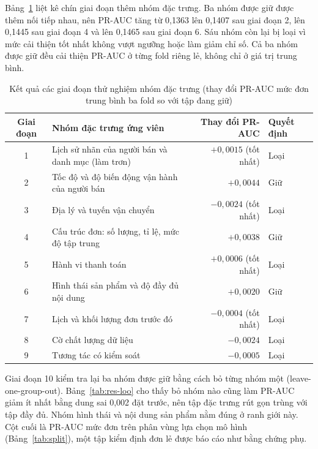 Bảng~\ref{tab:res-phases} liệt kê chín giai đoạn thêm nhóm đặc trưng. Ba nhóm được giữ được thêm nối tiếp nhau, nên PR-AUC tăng từ 0,1363 lên 0,1407 sau giai đoạn 2, lên 0,1445 sau giai đoạn 4 và lên 0,1465 sau giai đoạn 6. Sáu nhóm còn lại bị loại vì mức cải thiện tốt nhất không vượt ngưỡng hoặc làm giảm chỉ số. Cả ba nhóm được giữ đều cải thiện PR-AUC ở từng fold riêng lẻ, không chỉ ở giá trị trung bình.

\begin{table}[htbp]\centering\small
\caption{Kết quả các giai đoạn thử nghiệm nhóm đặc trưng (thay đổi PR-AUC mức đơn trung bình ba fold so với tập đang giữ)}\label{tab:res-phases}
\begin{tabular}{clrl}
\toprule
Giai đoạn & Nhóm đặc trưng ứng viên & Thay đổi PR-AUC & Quyết định \\
\midrule
1 & Lịch sử nhãn của người bán và danh mục (làm trơn) & $+0{,}0015$ (tốt nhất) & Loại \\
2 & Tốc độ và độ biến động vận hành của người bán & $+0{,}0044$ & Giữ \\
3 & Địa lý và tuyến vận chuyển & $-0{,}0024$ (tốt nhất) & Loại \\
4 & Cấu trúc đơn: số lượng, tỉ lệ, mức độ tập trung & $+0{,}0038$ & Giữ \\
5 & Hành vi thanh toán & $+0{,}0006$ (tốt nhất) & Loại \\
6 & Hình thái sản phẩm và độ đầy đủ nội dung & $+0{,}0020$ & Giữ \\
7 & Lịch và khối lượng đơn trước đó & $-0{,}0004$ (tốt nhất) & Loại \\
8 & Cờ chất lượng dữ liệu & $-0{,}0024$ & Loại \\
9 & Tương tác có kiểm soát & $-0{,}0005$ & Loại \\
\bottomrule
\end{tabular}
\end{table}

Giai đoạn 10 kiểm tra lại ba nhóm được giữ bằng cách bỏ từng nhóm một (leave-one-group-out). Bảng~\ref{tab:res-loo} cho thấy bỏ nhóm nào cũng làm PR-AUC giảm ít nhất bằng dung sai 0,002 đặt trước, nên tập đặc trưng rút gọn trùng với tập đầy đủ. Nhóm hình thái và nội dung sản phẩm nằm đúng ở ranh giới này. Cột cuối là PR-AUC mức đơn trên phân vùng lựa chọn mô hình (Bảng~\ref{tab:split}), một tập kiểm định đơn lẻ được báo cáo như bằng chứng phụ.

